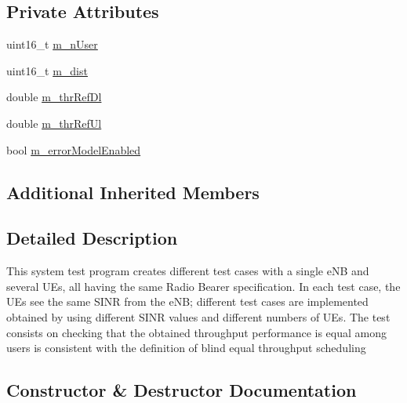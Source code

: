 \subsection*{Private Attributes}
\begin{DoxyCompactItemize}
\item 
uint16\+\_\+t \hyperlink{classLenaFdBetFfMacSchedulerTestCase1_a9c055f74557f2149bf01272cea885323}{m\+\_\+n\+User}
\item 
uint16\+\_\+t \hyperlink{classLenaFdBetFfMacSchedulerTestCase1_aa5770630ddb91328aa2c246cfe440327}{m\+\_\+dist}
\item 
double \hyperlink{classLenaFdBetFfMacSchedulerTestCase1_afad3bb9427ae1928c9983b91c9790fb7}{m\+\_\+thr\+Ref\+Dl}
\item 
double \hyperlink{classLenaFdBetFfMacSchedulerTestCase1_a758a3c328b35f8aadaffecddc45e3a40}{m\+\_\+thr\+Ref\+Ul}
\item 
bool \hyperlink{classLenaFdBetFfMacSchedulerTestCase1_a877001b40a970d4d4e5208e1fe76f423}{m\+\_\+error\+Model\+Enabled}
\end{DoxyCompactItemize}
\subsection*{Additional Inherited Members}


\subsection{Detailed Description}
This system test program creates different test cases with a single e\+NB and several U\+Es, all having the same Radio Bearer specification. In each test case, the U\+Es see the same S\+I\+NR from the e\+NB; different test cases are implemented obtained by using different S\+I\+NR values and different numbers of U\+Es. The test consists on checking that the obtained throughput performance is equal among users is consistent with the definition of blind equal throughput scheduling 

\subsection{Constructor \& Destructor Documentation}
